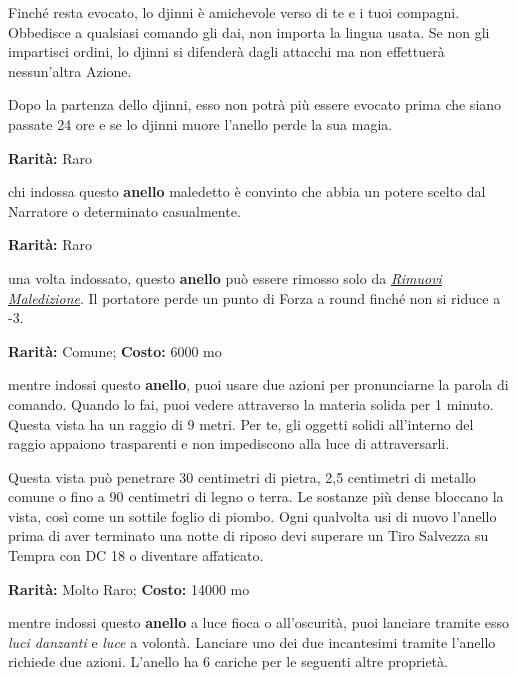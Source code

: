 \begin{multicols}{2}
Finché resta evocato, lo djinni è amichevole verso di te e i tuoi compagni. Obbedisce a qualsiasi comando gli dai, non importa la lingua usata. Se non gli impartisci ordini, lo djinni si difenderà dagli attacchi ma non effettuerà nessun'altra Azione.

Dopo la partenza dello djinni, esso non potrà più essere evocato prima che siano passate 24 ore e se lo djinni muore l'anello perde la sua magia.


\textbf{Rarità:} Raro

chi indossa questo \textbf{anello} maledetto è convinto che abbia un potere scelto dal Narratore o determinato casualmente.


\textbf{Rarità:} Raro

una volta indossato, questo \textbf{anello} può essere rimosso solo da \emph{\hyperlink{Rimuovi Maledizione}{Rimuovi Maledizione}}. Il portatore perde un punto di Forza a round finché non si riduce a -3.


\textbf{Rarità:} Comune; \textbf{Costo:} 6000 mo

mentre indossi questo \textbf{anello}, puoi usare due azioni per pronunciarne la parola di comando. Quando lo fai, puoi vedere attraverso la materia solida per 1 minuto. Questa vista ha un raggio di 9 metri. Per te, gli oggetti solidi all'interno del raggio appaiono trasparenti e non impediscono alla luce di attraversarli.

Questa vista può penetrare 30 centimetri di pietra, 2,5 centimetri di metallo comune o fino a 90 centimetri di legno o terra. Le sostanze più dense bloccano la vista, così come un sottile foglio di piombo. Ogni qualvolta usi di nuovo l'anello prima di aver terminato una notte di riposo devi superare un Tiro Salvezza su Tempra con DC 18 o diventare affaticato.


\textbf{Rarità:} Molto Raro; \textbf{Costo:} 14000 mo

mentre indossi questo \textbf{anello} a luce fioca o all'oscurità, puoi lanciare tramite esso \emph{luci danzanti} e \emph{luce} a volontà. Lanciare uno dei due incantesimi tramite l'anello richiede due azioni. L'anello ha 6 cariche per le seguenti altre proprietà.


\end{multicols}
